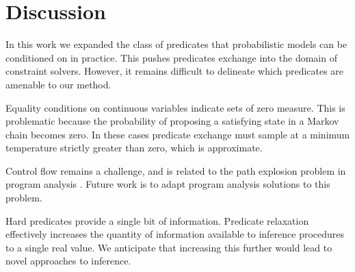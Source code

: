 \section{Discussion}
In this work we expanded the class of predicates that probabilistic models can be conditioned on in practice.
This pushes predicates exchange into the domain of constraint solvers.
However, it remains difficult to delineate which predicates are amenable to our method.

Equality conditions on continuous variables indicate sets of zero measure.
This is problematic because the probability of proposing a satisfying state in a Markov chain becomes zero.
In these cases predicate exchange must sample at a minimum temperature strictly greater than zero, which is approximate.

Control flow remains a challenge, and is related to the path explosion problem in program analysis \cite{cadar2008exe, sen2005cute}.
Future work is to adapt program analysis solutions to this problem.


Hard predicates provide a single bit of information.
Predicate relaxation effectively increases the quantity of information available to inference procedures to a single real value.
We anticipate that increasing this further would lead to novel approaches to inference.




